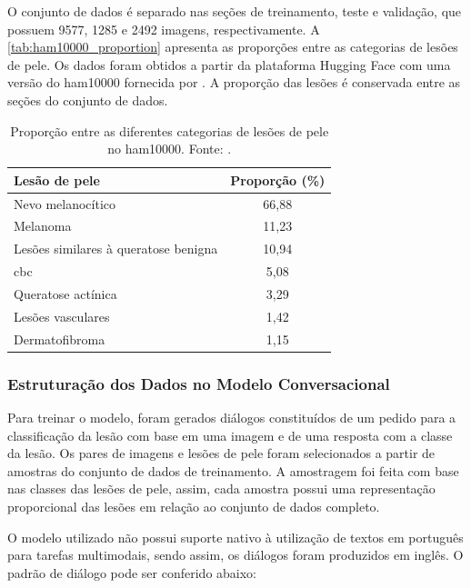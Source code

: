 O conjunto de dados é separado nas seções de treinamento, teste e validação, que possuem 9577, 1285 e 2492 imagens,
respectivamente. A \autoref{tab:ham10000_proportion} apresenta as proporções entre as categorias de lesões de pele. Os
dados foram obtidos a partir da plataforma Hugging Face com uma versão do \ac{ham10000} fornecida por
\textcite{skin_cancer_dataset}. A proporção das lesões é conservada entre as seções do conjunto de dados.

\begin{table}[ht]
    \centering
    \begin{tabular}{l|c}
        \hline
        Lesão de pele                        & Proporção (\%) \\ \hline
        Nevo melanocítico                    & 66,88          \\
        Melanoma                             & 11,23          \\
        Lesões similares à queratose benigna & 10,94          \\
        \ac{cbc}                             & 5,08           \\
        Queratose actínica                   & 3,29           \\
        Lesões vasculares                    & 1,42           \\
        Dermatofibroma                       & 1,15           \\ \hline
    \end{tabular}
    \label{tab:ham10000_proportion}
    \caption{Proporção entre as diferentes categorias de lesões de pele no \ac{ham10000}. Fonte:
    \textcite{tschandl2018ham10000}.}
\end{table}

\subsubsection{Estruturação dos Dados no Modelo Conversacional}

Para treinar o modelo, foram gerados diálogos constituídos de um pedido para a classificação da lesão com base em uma
imagem e de uma resposta com a classe da lesão. Os pares de imagens e lesões de pele foram selecionados a partir de
amostras do conjunto de dados de treinamento. A amostragem foi feita com base nas classes das lesões de pele, assim,
cada amostra possui uma representação proporcional das lesões em relação ao conjunto de dados completo.

O modelo utilizado não possui suporte nativo à utilização de textos em português para tarefas multimodais, sendo assim,
os diálogos foram produzidos em inglês. O padrão de diálogo pode ser conferido abaixo:

